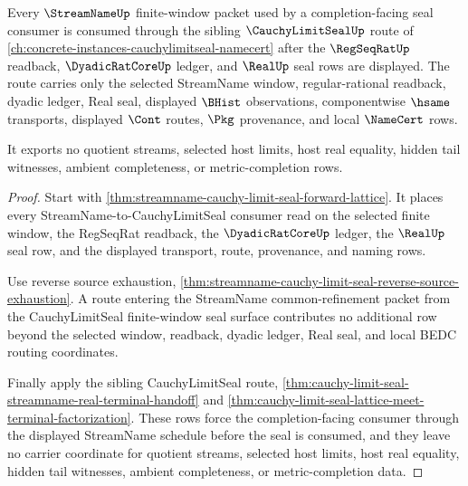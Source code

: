 \begin{theorem}
\label{thm:streamname-cauchy-limit-seal-downstream-orphan-route}
Every $\StreamNameUp$ finite-window packet used by a completion-facing seal consumer is consumed through the sibling $\CauchyLimitSealUp$ route of \autoref{ch:concrete-instances-cauchylimitseal-namecert} after the $\RegSeqRatUp$ readback, $\DyadicRatCoreUp$ ledger, and $\RealUp$ seal rows are displayed. The route carries only the selected StreamName window, regular-rational readback, dyadic ledger, Real seal, displayed $\BHist$ observations, componentwise $\hsame$ transports, displayed $\Cont$ routes, $\Pkg$ provenance, and local $\NameCert$ rows.

It exports no quotient streams, selected host limits, host real equality, hidden tail witnesses, ambient completeness, or metric-completion rows.
\end{theorem}
\begin{proof}
Start with \autoref{thm:streamname-cauchy-limit-seal-forward-lattice}. It places every StreamName-to-CauchyLimitSeal consumer read on the selected finite window, the RegSeqRat readback, the $\DyadicRatCoreUp$ ledger, the $\RealUp$ seal row, and the displayed transport, route, provenance, and naming rows.

Use reverse source exhaustion, \autoref{thm:streamname-cauchy-limit-seal-reverse-source-exhaustion}. A route entering the StreamName common-refinement packet from the CauchyLimitSeal finite-window seal surface contributes no additional row beyond the selected window, readback, dyadic ledger, Real seal, and local BEDC routing coordinates.

Finally apply the sibling CauchyLimitSeal route, \autoref{thm:cauchy-limit-seal-streamname-real-terminal-handoff} and \autoref{thm:cauchy-limit-seal-lattice-meet-terminal-factorization}. These rows force the completion-facing consumer through the displayed StreamName schedule before the seal is consumed, and they leave no carrier coordinate for quotient streams, selected host limits, host real equality, hidden tail witnesses, ambient completeness, or metric-completion data.
\end{proof}
